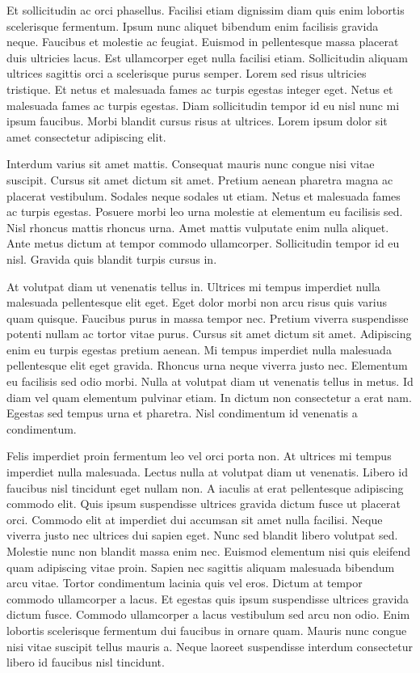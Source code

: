 \documentclass[11pt,a4paper]{article}
\begin{document}
Et sollicitudin ac orci phasellus. Facilisi etiam dignissim diam quis enim lobortis scelerisque fermentum. Ipsum nunc aliquet bibendum enim facilisis gravida neque. Faucibus et molestie ac feugiat. Euismod in pellentesque massa placerat duis ultricies lacus. Est ullamcorper eget nulla facilisi etiam. Sollicitudin aliquam ultrices sagittis orci a scelerisque purus semper. Lorem sed risus ultricies tristique. Et netus et malesuada fames ac turpis egestas integer eget. Netus et malesuada fames ac turpis egestas. Diam sollicitudin tempor id eu nisl nunc mi ipsum faucibus. Morbi blandit cursus risus at ultrices. Lorem ipsum dolor sit amet consectetur adipiscing elit.

Interdum varius sit amet mattis. Consequat mauris nunc congue nisi vitae suscipit. Cursus sit amet dictum sit amet. Pretium aenean pharetra magna ac placerat vestibulum. Sodales neque sodales ut etiam. Netus et malesuada fames ac turpis egestas. Posuere morbi leo urna molestie at elementum eu facilisis sed. Nisl rhoncus mattis rhoncus urna. Amet mattis vulputate enim nulla aliquet. Ante metus dictum at tempor commodo ullamcorper. Sollicitudin tempor id eu nisl. Gravida quis blandit turpis cursus in.

At volutpat diam ut venenatis tellus in. Ultrices mi tempus imperdiet nulla malesuada pellentesque elit eget. Eget dolor morbi non arcu risus quis varius quam quisque. Faucibus purus in massa tempor nec. Pretium viverra suspendisse potenti nullam ac tortor vitae purus. Cursus sit amet dictum sit amet. Adipiscing enim eu turpis egestas pretium aenean. Mi tempus imperdiet nulla malesuada pellentesque elit eget gravida. Rhoncus urna neque viverra justo nec. Elementum eu facilisis sed odio morbi. Nulla at volutpat diam ut venenatis tellus in metus. Id diam vel quam elementum pulvinar etiam. In dictum non consectetur a erat nam. Egestas sed tempus urna et pharetra. Nisl condimentum id venenatis a condimentum.

Felis imperdiet proin fermentum leo vel orci porta non. At ultrices mi tempus imperdiet nulla malesuada. Lectus nulla at volutpat diam ut venenatis. Libero id faucibus nisl tincidunt eget nullam non. A iaculis at erat pellentesque adipiscing commodo elit. Quis ipsum suspendisse ultrices gravida dictum fusce ut placerat orci. Commodo elit at imperdiet dui accumsan sit amet nulla facilisi. Neque viverra justo nec ultrices dui sapien eget. Nunc sed blandit libero volutpat sed. Molestie nunc non blandit massa enim nec. Euismod elementum nisi quis eleifend quam adipiscing vitae proin. Sapien nec sagittis aliquam malesuada bibendum arcu vitae. Tortor condimentum lacinia quis vel eros. Dictum at tempor commodo ullamcorper a lacus. Et egestas quis ipsum suspendisse ultrices gravida dictum fusce. Commodo ullamcorper a lacus vestibulum sed arcu non odio. Enim lobortis scelerisque fermentum dui faucibus in ornare quam. Mauris nunc congue nisi vitae suscipit tellus mauris a. Neque laoreet suspendisse interdum consectetur libero id faucibus nisl tincidunt.
\end{document}
